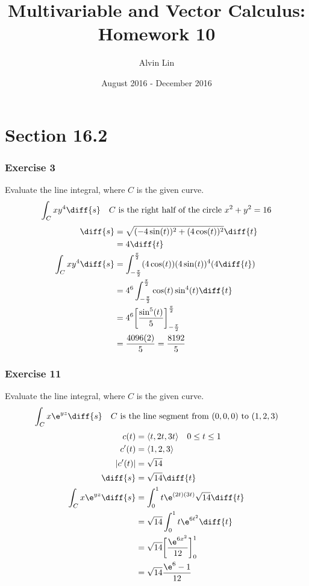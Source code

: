 \documentclass{math}
\title{Multivariable and Vector Calculus: Homework 10}
\author{Alvin Lin}
\date{August 2016 - December 2016}
\begin{document}
\maketitle

\section*{Section 16.2}

\subsubsection*{Exercise 3}
Evaluate the line integral, where \( C \) is the given curve.
\[ \int_{C}xy^4\diff{s} \quad C \text{ is the right half of the circle }
  x^2+y^2 = 16 \]
\begin{align*}
  \diff{s} &= \sqrt{(-4\sin(t))^2+(4\cos(t))^2}\diff{t} \\
  &= 4\diff{t} \\
  \int_{C}xy^4\diff{s} &= \int_{-\frac{\pi}{2}}^{\frac{\pi}{2}}
    (4\cos(t))(4\sin(t))^4(4\diff{t}) \\
  &= 4^6\int_{-\frac{\pi}{2}}^{\frac{\pi}{2}}\cos(t)\sin^4(t)\diff{t} \\
  &= 4^6\bigg[\frac{\sin^5(t)}{5}\bigg]_{-\frac{\pi}{2}}^{\frac{\pi}{2}} \\
  &= \frac{4096(2)}{5} = \frac{8192}{5}
\end{align*}

\subsubsection*{Exercise 11}
Evaluate the line integral, where \( C \) is the given curve.
\[ \int_{C}x\e^{yz}\diff{s} \quad C \text{ is the line segment from }
  (0,0,0) \text{ to } (1,2,3) \]
\begin{align*}
  c(t) &= \langle t,2t,3t\rangle \quad 0\le t\le 1 \\
  c'(t) &= \langle1,2,3\rangle \\
  |c'(t)| &= \sqrt{14} \\
  \diff{s} &= \sqrt{14}\diff{t} \\
  \int_{C}x\e^{yz}\diff{s} &= \int_{0}^{1}t\e^{(2t)(3t)}\sqrt{14}\diff{t} \\
  &= \sqrt{14}\int_{0}^{1}t\e^{6t^2}\diff{t} \\
  &= \sqrt{14}\bigg[\frac{\e^{6x^2}}{12}\bigg]_{0}^{1} \\
  &= \sqrt{14}\frac{\e^6-1}{12}
\end{align*}
\end{document}
